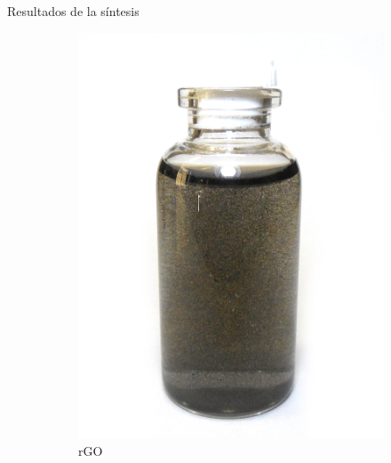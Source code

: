 \documentclass[aspectratio=169]{beamer}
\begin{document}
	\begin{frame}{Resultados de la síntesis}
		\begin{figure}[h]
			\centering
			{
				\begin{subfigure}{0.3\textwidth}
					\includegraphics[width=\textwidth]{RGO_pic.png}
					\caption{rGO}
					\label{fig:RGO}
				\end{subfigure}
				\begin{subfigure}{0.31\textwidth}

\end{subfigure}}
\end{figure}
\end{frame}
\end{document}

